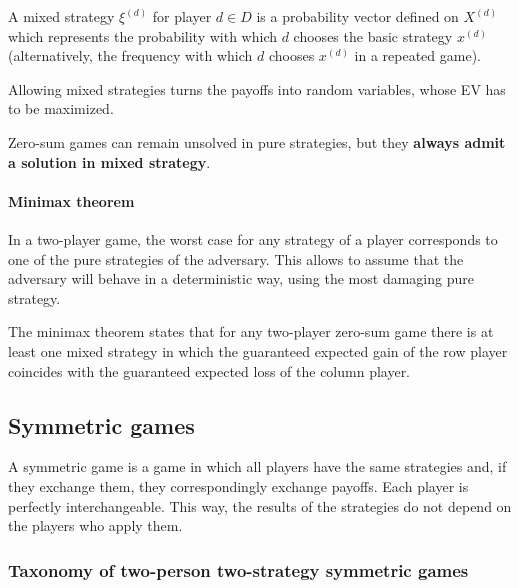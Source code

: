 A mixed strategy $\xi^{(d)}$ for player $d \in D$ is a probability vector defined on $X^{(d)}$ which represents the probability with which $d$ chooses the basic strategy $x^{(d)}$ (alternatively, the frequency with which $d$ chooses $x^{(d)}$ in a repeated game).

Allowing mixed strategies turns the payoffs into random variables, whose EV has to be maximized.

Zero-sum games can remain unsolved in pure strategies, but they \textbf{always admit a solution in mixed strategy}. 

\paragraph{Minimax theorem} In a two-player game, the worst case for any strategy of a player corresponds to one of the pure strategies of the adversary. This allows to assume that the adversary will behave in a deterministic way, using the most damaging pure strategy. 

The minimax theorem states that for any two-player zero-sum game there is at least one mixed strategy in which the guaranteed expected gain of the row player coincides with the guaranteed expected loss of the column player.


\subsection{Symmetric games}

A symmetric game is a game in which all players have the same strategies and, if they exchange them, they correspondingly exchange payoffs. Each player is perfectly interchangeable. This way, the results of the strategies do not depend on the players who apply them.

\subsubsection{Taxonomy of two-person two-strategy symmetric games}

